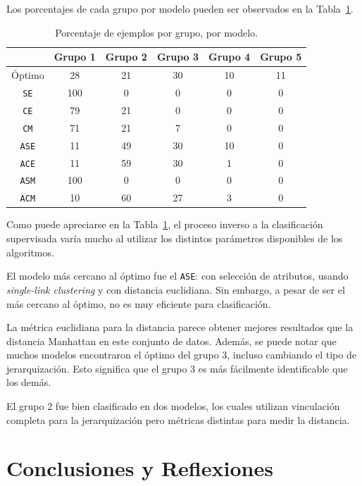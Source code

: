 \documentclass{llncs}
\begin{document}
Los porcentajes de cada grupo por modelo pueden ser observados en la Tabla~\ref{tab:cluster}.

\begin{table}[htbp]
\centering
\caption{Porcentaje de ejemplos por grupo, por modelo.}
\label{tab:cluster}
\begin{tabular}{@{}cccccc@{}}
\toprule
       & Grupo 1 & Grupo 2 & Grupo 3 & Grupo 4 & Grupo 5 \\ \midrule
Óptimo & 28      & 21      & 30      & 10      & 11      \\
\texttt{SE}     & 100     & 0       & 0       & 0       & 0       \\
\texttt{CE}     & 79      & 21      & 0       & 0       & 0       \\
\texttt{CM}     & 71      & 21      & 7       & 0       & 0       \\
\texttt{ASE}    & 11      & 49      & 30      & 10      & 0       \\
\texttt{ACE}    & 11      & 59      & 30      & 1       & 0       \\
\texttt{ASM}    & 100     & 0       & 0       & 0       & 0       \\
\texttt{ACM}    & 10      & 60      & 27      & 3       & 0       \\ \bottomrule
\end{tabular}
\end{table}

Como puede apreciarse en la Tabla~\ref{tab:cluster}, el proceso inverso a la clasificación supervisada varía mucho al utilizar los distintos parámetros disponibles de los algoritmos.

El modelo más cercano al óptimo fue el \texttt{ASE}: con selección de atributos, usando \textit{single-link clustering} y con distancia euclidiana.
Sin embargo, a pesar de ser el más cercano al óptimo, no es muy eficiente para clasificación.

La métrica euclidiana para la distancia parece obtener mejores resultados que la distancia Manhattan en este conjunto de datos.
Además, se puede notar que muchos modelos encontraron el óptimo del grupo 3, incluso cambiando el tipo de jerarquización.
Esto significa que el grupo 3 es más fácilmente identificable que los demás.

El grupo 2 fue bien clasificado en dos modelos,
los cuales utilizan vinculación completa para la jerarquización pero métricas distintas para medir la distancia.

\section{Conclusiones y Reflexiones}
\label{sec:conc}
\end{document}
